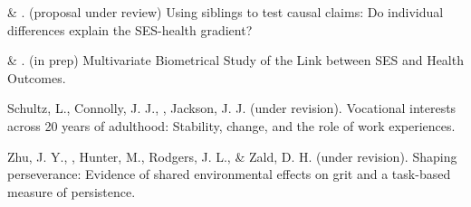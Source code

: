 \item \meb \& \joe. (proposal under review) Using siblings to test causal claims: Do individual differences explain the SES-health gradient?
\item \meb \& \joe. (in prep) Multivariate Biometrical Study of the Link between SES and Health Outcomes.
\item Schultz, L., Connolly, J. J., \meb, Jackson, J. J. (under revision). Vocational interests across 20 years of adulthood: Stability, change, and the role of work experiences.
\item Zhu, J. Y., \meb, Hunter, M., Rodgers, J. L., \& Zald, D. H. (under revision). Shaping perseverance: Evidence of shared environmental effects on grit and a task-based measure of persistence.
\vspace{-2mm}\begin{center}\end{center} \vspace{-4mm}